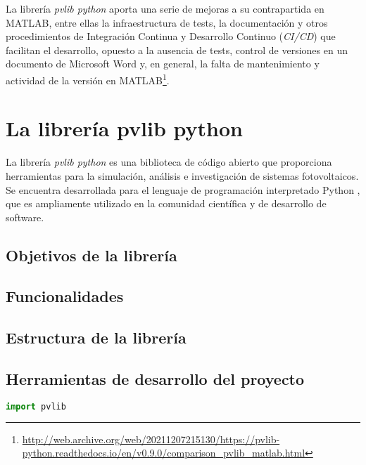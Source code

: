 La librería \textit{pvlib python} aporta una serie de mejoras a su contrapartida en MATLAB, entre ellas la infraestructura de tests, la documentación y otros procedimientos de Integración Continua y Desarrollo Continuo (\textit{CI/CD}) que facilitan el desarrollo, opuesto a la ausencia de tests, control de versiones en un documento de Microsoft Word y, en general, la falta de mantenimiento y actividad de la versión en MATLAB\footnote{\url{http://web.archive.org/web/20211207215130/https://pvlib-python.readthedocs.io/en/v0.9.0/comparison_pvlib_matlab.html}}.

\section{La librería pvlib python} \label{sct:pvlib}

La librería \textit{pvlib python} es una biblioteca de código abierto que proporciona herramientas para la simulación, análisis e investigación de sistemas fotovoltaicos. Se encuentra desarrollada para el lenguaje de programación interpretado Python \cite{CS-R9526}, que es ampliamente utilizado en la comunidad científica y de desarrollo de software.

\subsection{Objetivos de la librería} \label{ssct:pvlib:objetivos}

\subsection{Funcionalidades} \label{ssct:pvlib:funcionalidades}

\subsection{Estructura de la librería} \label{ssct:pvlib:estructura}

\subsection{Herramientas de desarrollo del proyecto} \label{ssct:pvlib:herramientas}

\begin{lstlisting}[language=Python]
import pvlib

\end{lstlisting}
